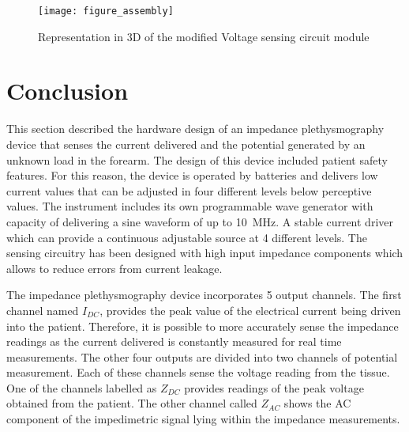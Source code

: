 \begin{figure}[!htpb]
	\centering
	\texttt{[image: figure\_assembly]}
	\caption{Representation in 3D of the modified Voltage sensing circuit module}
	\label{fig:assembly}
\end{figure}

\section{Conclusion}
\label{conclusion impedance device}
This section described the hardware design of an impedance plethysmography device that senses the current delivered and the potential generated by an unknown load in the forearm. The design of this device included patient safety features. For this reason, the device is operated by batteries and delivers low current values that can be adjusted in four different levels below perceptive values. The instrument includes its own programmable wave generator with capacity of delivering a sine waveform of up to \SI{10}{\mega\hertz}. A stable current driver which can provide a continuous adjustable source at 4 different levels. The sensing circuitry has been designed with high input impedance components which allows to reduce errors from current leakage.

The impedance plethysmography device incorporates 5 output channels. The first channel named $I_{DC}$, provides the peak value of the electrical current being driven into the patient. Therefore, it is possible to more accurately sense the impedance readings as the current delivered is constantly measured for real time measurements. The other four outputs are divided into two channels of potential measurement. Each of these channels sense the voltage reading from the tissue. One of the channels labelled as $Z_{DC}$ provides readings of the peak voltage obtained from the patient. The other channel called $Z_{AC}$ shows the AC component of the impedimetric signal lying within the impedance measurements.  


